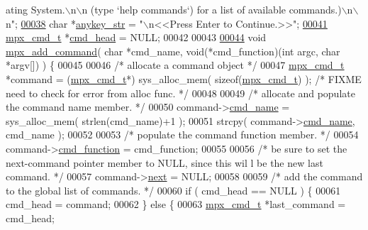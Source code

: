 \begin{DoxyCode}
{      ating System.\(\backslash\)n\(\backslash\)n    (type `help commands`) for a list of available commands.)\(\backslash\)n\(\backslash\)
      n"};  
\hypertarget{_m_p_x___c_m_d_8_c_source_l00038}{}\hyperlink{_m_p_x___c_m_d_8_c_a35b541517c624b5cabacaaa78ac41c70}{00038} \textcolor{keywordtype}{char} *\hyperlink{_m_p_x___c_m_d_8_c_a35b541517c624b5cabacaaa78ac41c70}{anykey_str}                = \textcolor{stringliteral}{"\(\backslash\)n<<Press Enter to Continue.>>"};
\hypertarget{_m_p_x___c_m_d_8_c_source_l00041}{}\hyperlink{_m_p_x___c_m_d_8_c_af2d59668915a0a985c5301d887031811}{00041} \hyperlink{structmpx__cmd}{mpx_cmd_t} *\hyperlink{_m_p_x___c_m_d_8_c_af2d59668915a0a985c5301d887031811}{cmd_head} = NULL;
00042 
00043 
\hypertarget{_m_p_x___c_m_d_8_c_source_l00044}{}\hyperlink{_m_p_x___c_m_d_8_c_a52c02eb85fda9ac4278e10088a192e89}{00044} \textcolor{keywordtype}{void} \hyperlink{_m_p_x___c_m_d_8_c_a52c02eb85fda9ac4278e10088a192e89}{mpx_add_command}( \textcolor{keywordtype}{char} *cmd\_name, \textcolor{keywordtype}{void}(*cmd\_function)(\textcolor{keywordtype}{int} argc, \textcolor{keywordtype}{char} *argv[])
       ) \{
00045 
00046         \textcolor{comment}{/* allocate a command object */}
00047         \hyperlink{structmpx__cmd}{mpx_cmd_t} *command = (\hyperlink{structmpx__cmd}{mpx_cmd_t}*) sys\_alloc\_mem( \textcolor{keyword}{sizeof}(\hyperlink{structmpx__cmd}{mpx_cmd_t}) ); \textcolor{comment}{/* 
      FIXME need to check for error from alloc func. */}
00048 
00049         \textcolor{comment}{/* allocate and populate the command name member. */}
00050         command->\hyperlink{structmpx__cmd_aeae73296151ffcec319820f4d8399e51}{cmd_name} = sys\_alloc\_mem( strlen(cmd\_name)+1 );
00051         strcpy( command->\hyperlink{structmpx__cmd_aeae73296151ffcec319820f4d8399e51}{cmd_name}, cmd\_name );
00052 
00053         \textcolor{comment}{/* populate the command function member. */}
00054         command->\hyperlink{structmpx__cmd_ad35d459cc43aac3f75fb308e07572253}{cmd_function} = cmd\_function;
00055 
00056         \textcolor{comment}{/* be sure to set the next-command pointer member to NULL, since this wil
      l be the new last command. */}
00057         command->\hyperlink{structmpx__cmd_a863c991d0d31b283791615b5f5fe03bb}{next} = NULL;
00058 
00059         \textcolor{comment}{/* add the command to the global list of commands. */}
00060         \textcolor{keywordflow}{if} ( cmd\_head == NULL ) \{ 
00061                 cmd\_head = command;
00062         \} \textcolor{keywordflow}{else} \{
00063                 \hyperlink{structmpx__cmd}{mpx_cmd_t} *last\_command = cmd\_head;

\end{DoxyCode}
